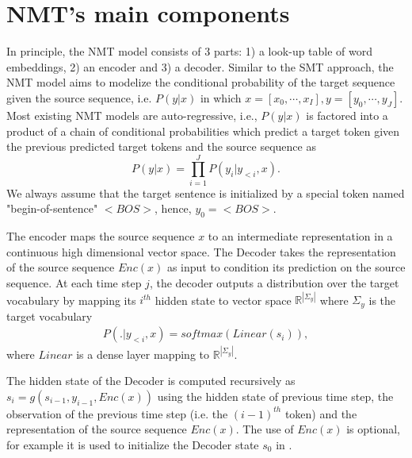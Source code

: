 \section{NMT's main components}
In principle, the NMT model consists of 3 parts: 1) a look-up table of word embeddings, 2) an encoder and 3) a decoder. Similar to the SMT approach, the NMT model aims to modelize the conditional probability of the target sequence given the source sequence, i.e. $P(y|x)$ in which $x=[x_0,\cdots,x_{I}], y=[y_0,\cdots,y_{J}]$. Most existing NMT models are auto-regressive, i.e., $P(y|x)$ is factored into a product of a chain of conditional probabilities which predict a target token given the previous predicted target tokens and the source sequence as
\begin{equation}
P(y|x) = \displaystyle{\mathop{\prod}_{i=1}^{J}} P(y_i|y_{<i},x).
\end{equation}
We always assume that the target sentence is initialized by a special token named "begin-of-sentence" $<BOS>$, hence, $y_{0}=<BOS>$. 

The encoder maps the source sequence $x$ to an intermediate representation in a continuous high dimensional vector space. The Decoder takes the representation of the source sequence $Enc(x)$ as input to condition its prediction on the source sequence. At each time step $j$, the decoder outputs a distribution over the target vocabulary by mapping its $i^{th}$ hidden state to vector space $\mathbb{R}^{|\Sigma_y|}$ where $\Sigma_y$ is the target vocabulary
\begin{equation}
\begin{array}{rcl}
P(.|y_{<i},x) = softmax(Linear(s_i)),
\end{array}
\end{equation}
where $Linear$ is a dense layer mapping to $\mathbb{R}^{|\Sigma_y|}$.

The hidden state of the Decoder is computed recursively as $s_i = g(s_{i-1},y_{i-1},Enc(x))$ using the hidden state of previous time step, the observation of the previous time step (i.e. the $(i-1)^{th}$ token) and the representation of the source sequence $Enc(x)$. The use of $Enc(x)$ is optional, for example it is used to initialize the Decoder state $s_0$ in \cite{Sutskever14sequence}.

